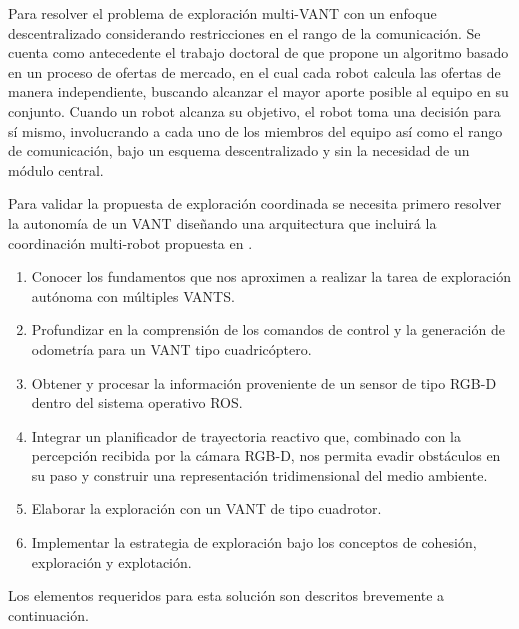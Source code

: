 Para resolver el problema de exploración multi-VANT con un enfoque descentralizado considerando restricciones en el rango de la comunicación. Se cuenta como antecedente el trabajo doctoral de \citeauthor{CINVESTAM2013} que propone un algoritmo basado en un proceso de ofertas de mercado, en el cual cada robot calcula las ofertas de manera independiente, buscando alcanzar el mayor aporte posible al equipo en su conjunto. Cuando un robot alcanza su objetivo, el robot toma una decisión para sí mismo, involucrando a cada uno de los miembros del equipo así como el rango de comunicación, bajo un esquema descentralizado y sin la necesidad de un módulo central.

Para validar la propuesta de exploración coordinada se necesita primero resolver la autonomía de un VANT diseñando una arquitectura que incluirá la coordinación multi-robot propuesta en \cite{CINVESTAM2013}.

\begin{enumerate}\setlength{\itemsep}{-1mm}
\item Conocer los fundamentos que nos aproximen a realizar la tarea de exploración autónoma con múltiples VANTS.
  \item Profundizar en la comprensión de los comandos de control y la generación de odometría para un VANT tipo cuadricóptero.
  \item Obtener y procesar la información proveniente de un sensor de tipo RGB-D dentro del sistema operativo ROS.
  \item Integrar un planificador de trayectoria reactivo que, combinado con la percepción recibida por la cámara RGB-D, nos permita evadir obstáculos en su paso y construir una representación tridimensional del medio ambiente.
  \item Elaborar la exploración con un VANT de tipo cuadrotor.
  \item Implementar la estrategia de exploración bajo los conceptos de cohesión, exploración y explotación.
\end{enumerate}

Los elementos requeridos para esta solución son descritos brevemente a continuación.

